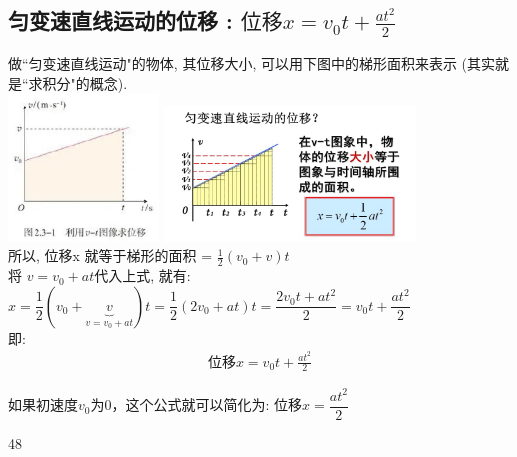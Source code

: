 \documentclass[UTF8]{ctexart}
\begin{document}
\subsection{匀变速直线运动的位移 : $\text{位移}x=v_0t+\frac{at^2}{2}$}

做``匀变速直线运动"的物体, 其位移大小, 可以用下图中的梯形面积来表示 (其实就是``求积分"的概念). \\
\includegraphics[width=0.3\textwidth]{img/0111.png} 
\includegraphics[width=0.5\textwidth]{img/0112.png} \\

所以, 位移x 就等于梯形的面积 = $\frac{1}{2}\left( v_0+v \right) t$\\
将 $v=v_0 + at$代入上式, 就有: \\
$
x=\dfrac{1}{2}\left( v_0+\underset{v=v_0+at}{\underbrace{v}} \right) t=\dfrac{1}{2}\left( 2v_0+at \right) t=\dfrac{2v_0t+at^2}{2}=v_0t+\dfrac{at^2}{2}
$ \\
即: 
\begin{align*}
	\boxed{
		\text{位移}x=v_0t+\frac{at^2}{2}
	}
\end{align*}

如果初速度$v_0$为0，这个公式就可以简化为: $\text{位移}x=\dfrac{at^2}{2}$\\


\begin{myEnvSample}

\end{myEnvSample}







	48
	
	
	
	
	
\end{document}
